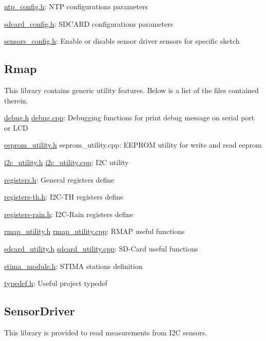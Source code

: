 \hyperlink{ntp__config_8h}{ntp\+\_\+config.\+h}\+: N\+TP configuration\textquotesingle{}s parameters

\hyperlink{sdcard__config_8h}{sdcard\+\_\+config.\+h}\+: S\+D\+C\+A\+RD configuration\textquotesingle{}s parameters

\hyperlink{sensors__config_8h}{sensors\+\_\+config.\+h}\+: Enable or disable sensor driver sensors for specific sketch\hypertarget{index_Rmap}{}\subsection{Rmap}\label{index_Rmap}
This library contains generic utility features. Below is a list of the files contained therein.

\hyperlink{debug_8h}{debug.\+h} \hyperlink{debug_8cpp}{debug.\+cpp}\+: Debugging functions for print debug message on serial port or L\+CD

\hyperlink{eeprom__utility_8h}{eeprom\+\_\+utility.\+h} eeprom\+\_\+utility.\+cpp\+: E\+E\+P\+R\+OM utility for write and read eeprom

\hyperlink{i2c__utility_8h}{i2c\+\_\+utility.\+h} \hyperlink{i2c__utility_8cpp}{i2c\+\_\+utility.\+cpp}\+: I2C utility

\hyperlink{registers_8h}{registers.\+h}\+: General register\textquotesingle{}s define

\hyperlink{registers-th_8h}{registers-\/th.\+h}\+: I2\+C-\/\+TH register\textquotesingle{}s define

\hyperlink{registers-rain_8h}{registers-\/rain.\+h}\+: I2\+C-\/\+Rain register\textquotesingle{}s define

\hyperlink{rmap__utility_8h}{rmap\+\_\+utility.\+h} \hyperlink{rmap__utility_8cpp}{rmap\+\_\+utility.\+cpp}\+: R\+M\+AP useful functions

\hyperlink{sdcard__utility_8h}{sdcard\+\_\+utility.\+h} \hyperlink{sdcard__utility_8cpp}{sdcard\+\_\+utility.\+cpp}\+: S\+D-\/\+Card useful functions

\hyperlink{stima__module_8h}{stima\+\_\+module.\+h}\+: S\+T\+I\+MA station\textquotesingle{}s definition

\hyperlink{typedef_8h}{typedef.\+h}\+: Useful project typedef\hypertarget{index_SensorDriver}{}\subsection{Sensor\+Driver}\label{index_SensorDriver}
This library is provided to read measurements from I2C sensors.

